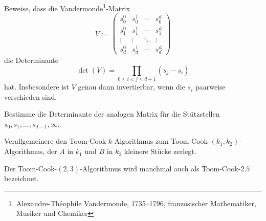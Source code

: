 
\begin{sheet}

\begin{problem}[title={Vandermonde-Determinante}, difficulty={mittel}]
Beweise, dass die Vandermonde\footnote{Alexandre-Théophile Vandermonde, 1735--1796, französischer Mathematiker, Musiker und Chemiker}-Matrix
\[V:=\begin{pmatrix}
s_0^0 & s_0^1 & \cdots & s_0^d \\
s_1^0 & s_1^1 & \cdots & s_1^d \\
\vdots & \vdots & \ddots & \vdots \\
s_d^0 & s_d^1 & \cdots & s_d^d
\end{pmatrix}\]
die Determinante
\[\det(V) = \prod_{0\leq i<j\leq d+1} (s_j-s_i)\]
hat. Insbesondere ist $V$ genau dann invertierbar, wenn die $s_i$ paarweise verschieden sind.
\end{problem}

\begin{problem}[difficulty={leicht}]
Bestimme die Determinante der analogen Matrix für die Stützstellen $s_0,s_1,\ldots,s_{d-1},\infty$.
\end{problem}

\begin{problem}
Verallgemeinere den Toom-Cook-$k$-Algorithmus zum Toom-Cook-$(k_1,k_2)$-Algorithmus, der $A$ in $k_1$ und $B$ in $k_2$ kleinere Stücke zerlegt.
\end{problem}

\begin{remark}
Der Toom-Cook-$(2,3)$-Algorithmus wird manchmal auch als Toom-Cook-$2.5$ bezeichnet.
\end{remark}

\end{sheet}